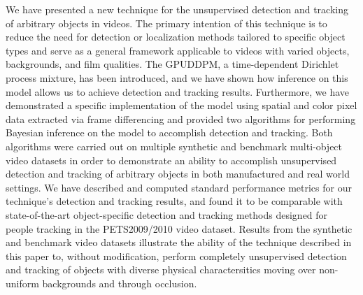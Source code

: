 \documentclass[twocolumn, final]{svjour3}
\begin{document}
We have presented a new technique for the unsupervised detection and tracking of arbitrary objects in videos. The primary intention of this technique is to reduce the need for detection or localization methods tailored to specific object types and serve as a general framework applicable to videos with varied objects, backgrounds, and film qualities. The GPUDDPM, a time-dependent Dirichlet process mixture, has been introduced, and we have shown how inference on this model allows us to achieve detection and tracking results. Furthermore, we have demonstrated a specific implementation of the model using spatial and color pixel data extracted via frame differencing and provided two algorithms for performing Bayesian inference on the model to accomplish detection and tracking. Both algorithms were carried out on multiple synthetic and benchmark multi-object video datasets in order to demonstrate an ability to accomplish unsupervised detection and tracking of arbitrary objects in both manufactured and real world settings. We have described and computed standard performance metrics for our technique's detection and tracking results, and found it to be comparable with state-of-the-art object-specific detection and tracking methods designed for people tracking in the PETS2009/2010 video dataset. Results from the synthetic and benchmark video datasets illustrate the ability of the technique described in this paper to, without modification, perform completely unsupervised detection and tracking of objects with diverse physical charactersitics moving over non-uniform backgrounds and through occlusion.




\begin{small}

 
\end{small}
\end{document}
